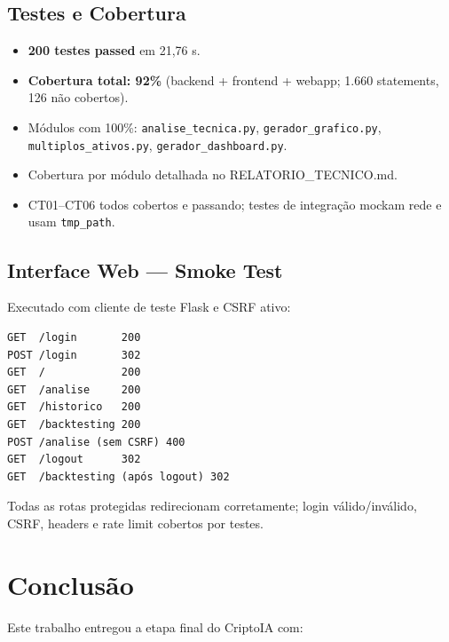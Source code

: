 \documentclass[conference]{IEEEtran}
\begin{document}
\subsection{Testes e Cobertura}

\begin{itemize}
  \item \textbf{200 testes passed} em 21,76 s.
  \item \textbf{Cobertura total: 92\%} (backend + frontend + webapp; 1.660 statements, 126 não cobertos).
  \item Módulos com 100\%: \texttt{analise\_tecnica.py}, \texttt{gerador\_grafico.py}, \texttt{multiplos\_ativos.py}, \texttt{gerador\_dashboard.py}.
  \item Cobertura por módulo detalhada no RELATORIO\_TECNICO.md.
  \item CT01–CT06 todos cobertos e passando; testes de integração mockam rede e usam \texttt{tmp\_path}.
\end{itemize}

\subsection{Interface Web — Smoke Test}

Executado com cliente de teste Flask e CSRF ativo:

\begin{verbatim}
GET  /login       200
POST /login       302
GET  /            200
GET  /analise     200
GET  /historico   200
GET  /backtesting 200
POST /analise (sem CSRF) 400
GET  /logout      302
GET  /backtesting (após logout) 302
\end{verbatim}

Todas as rotas protegidas redirecionam corretamente; login válido/inválido, CSRF, headers e rate limit cobertos por testes.

\section{Conclusão}
\label{sec:conclusao}

Este trabalho entregou a etapa final do CriptoIA com:
\end{document}
